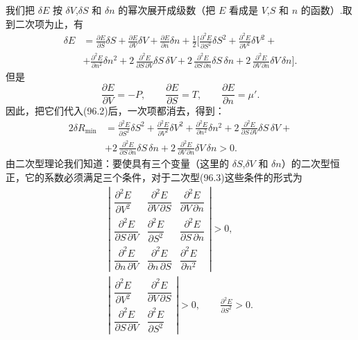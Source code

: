 我们把 $\delta E$ 按 $\delta V$,$\delta S$ 和 $\delta n$ 的幂次展开成级数（把 $E$ 看成是 $V$,$S$ 和 $n$ 的函数）.取到二次项为止，有
\begin{equation*}
\begin{aligned}
  \delta E&=\frac{\partial E}{\partial S}\delta S
  +\frac{\partial E}{\partial V}\delta V
  +\frac{\partial E}{\partial n}\delta n
  +\frac{1}{2}\biggl[\frac{\partial^2E}{\partial S^2}\delta S^2
  +\frac{\partial^2E}{\partial V^2}\delta V^2+\\
  &+\frac{\partial^2E}{\partial n^2}\delta n^2
  +2\,\frac{\partial^2E}{\partial S\,\partial V}\delta S\,\delta V
  +2\,\frac{\partial^2E}{\partial S\,\partial n}\delta S\,\delta n
  +2\,\frac{\partial^2E}{\partial V\,\partial n}\delta V\,\delta n\biggr].
\end{aligned}
\end{equation*}
但是
\begin{equation*}
  \frac{\partial E}{\partial V}=-P,\qquad
  \frac{\partial E}{\partial S}=T,\qquad
  \frac{\partial E}{\partial n}=\mu'.
\end{equation*}
因此，把它们代入(96.2)后，一次项都消去，得到：
\begin{equation}
\begin{aligned}
  2\delta R_{\min}&=\frac{\partial^2E}{\partial S^2}\delta S^2
  +\frac{\partial^2E}{\partial V^2}\delta V^2
  +\frac{\partial^2E}{\partial n^2}\delta n^2
  +2\,\frac{\partial^2E}{\partial S\,\partial V}\delta S\,\delta V+\\
  &+2\,\frac{\partial^2E}{\partial S\,\partial n}\delta S\,\delta n
  +2\,\frac{\partial^2E}{\partial V\,\partial n}\delta V\,\delta n>0.
\end{aligned}
\end{equation}
由二次型理论我们知道：要使具有三个变量（这里的 $\delta S$,$\delta V$ 和 $\delta n$）的二次型恒正，它的系数必须满足三个条件，对于二次型(96.3)这些条件的形式为
\begin{equation}
\begin{gathered}
  \left|\begin{array}{lll}
    \dfrac{\partial^2E}{\partial V^2} & \dfrac{\partial^2E}{\partial V\,\partial S} & \dfrac{\partial^2E}{\partial V\,\partial n}\\[2ex]
    \dfrac{\partial^2E}{\partial S\,\partial V} & \dfrac{\partial^2E}{\partial S^2} & \dfrac{\partial^2E}{\partial S\,\partial n}\\[2ex]
    \dfrac{\partial^2E}{\partial n\,\partial V} & \dfrac{\partial^2E}{\partial n\,\partial S} & \dfrac{\partial^2E}{\partial n^2}
  \end{array}\right|>0,\\[6ex]
  \left|\begin{array}{ll}
    \dfrac{\partial^2E}{\partial V^2} & \dfrac{\partial^2E}{\partial V\,\partial S}\\[2ex]
    \dfrac{\partial^2E}{\partial S\,\partial V} & \dfrac{\partial^2E}{\partial S^2}
  \end{array}\right|>0,\qquad
  \frac{\partial^2E}{\partial S^2}>0.
\end{gathered}
\end{equation}
